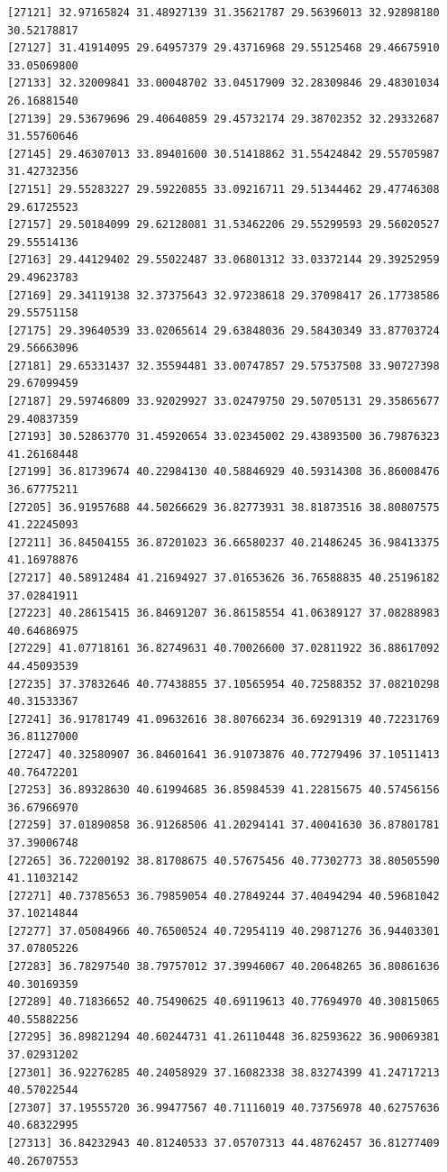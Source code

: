 \documentclass[
  letterpaper,
  DIV=11,
  numbers=noendperiod]{scrartcl}
\begin{document}
\begin{verbatim}
[27121] 32.97165824 31.48927139 31.35621787 29.56396013 32.92898180 30.52178817
[27127] 31.41914095 29.64957379 29.43716968 29.55125468 29.46675910 33.05069800
[27133] 32.32009841 33.00048702 33.04517909 32.28309846 29.48301034 26.16881540
[27139] 29.53679696 29.40640859 29.45732174 29.38702352 32.29332687 31.55760646
[27145] 29.46307013 33.89401600 30.51418862 31.55424842 29.55705987 31.42732356
[27151] 29.55283227 29.59220855 33.09216711 29.51344462 29.47746308 29.61725523
[27157] 29.50184099 29.62128081 31.53462206 29.55299593 29.56020527 29.55514136
[27163] 29.44129402 29.55022487 33.06801312 33.03372144 29.39252959 29.49623783
[27169] 29.34119138 32.37375643 32.97238618 29.37098417 26.17738586 29.55751158
[27175] 29.39640539 33.02065614 29.63848036 29.58430349 33.87703724 29.56663096
[27181] 29.65331437 32.35594481 33.00747857 29.57537508 33.90727398 29.67099459
[27187] 29.59746809 33.92029927 33.02479750 29.50705131 29.35865677 29.40837359
[27193] 30.52863770 31.45920654 33.02345002 29.43893500 36.79876323 41.26168448
[27199] 36.81739674 40.22984130 40.58846929 40.59314308 36.86008476 36.67775211
[27205] 36.91957688 44.50266629 36.82773931 38.81873516 38.80807575 41.22245093
[27211] 36.84504155 36.87201023 36.66580237 40.21486245 36.98413375 41.16978876
[27217] 40.58912484 41.21694927 37.01653626 36.76588835 40.25196182 37.02841911
[27223] 40.28615415 36.84691207 36.86158554 41.06389127 37.08288983 40.64686975
[27229] 41.07718161 36.82749631 40.70026600 37.02811922 36.88617092 44.45093539
[27235] 37.37832646 40.77438855 37.10565954 40.72588352 37.08210298 40.31533367
[27241] 36.91781749 41.09632616 38.80766234 36.69291319 40.72231769 36.81127000
[27247] 40.32580907 36.84601641 36.91073876 40.77279496 37.10511413 40.76472201
[27253] 36.89328630 40.61994685 36.85984539 41.22815675 40.57456156 36.67966970
[27259] 37.01890858 36.91268506 41.20294141 37.40041630 36.87801781 37.39006748
[27265] 36.72200192 38.81708675 40.57675456 40.77302773 38.80505590 41.11032142
[27271] 40.73785653 36.79859054 40.27849244 37.40494294 40.59681042 37.10214844
[27277] 37.05084966 40.76500524 40.72954119 40.29871276 36.94403301 37.07805226
[27283] 36.78297540 38.79757012 37.39946067 40.20648265 36.80861636 40.30169359
[27289] 40.71836652 40.75490625 40.69119613 40.77694970 40.30815065 40.55882256
[27295] 36.89821294 40.60244731 41.26110448 36.82593622 36.90069381 37.02931202
[27301] 36.92276285 40.24058929 37.16082338 38.83274399 41.24717213 40.57022544
[27307] 37.19555720 36.99477567 40.71116019 40.73756978 40.62757636 40.68322995
[27313] 36.84232943 40.81240533 37.05707313 44.48762457 36.81277409 40.26707553

\end{verbatim}
\end{document}
